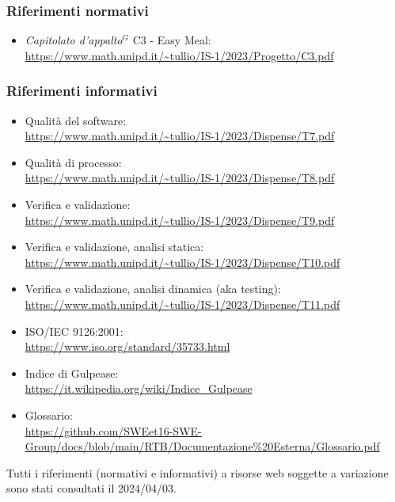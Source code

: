\subsubsection{Riferimenti normativi}
    \begin{itemize}
      \item \emph{Capitolato d’appalto}$^{G}$ C3 - Easy Meal: \\
        \url{https://www.math.unipd.it/~tullio/IS-1/2023/Progetto/C3.pdf}
    \end{itemize}
\subsubsection{Riferimenti informativi}
\begin{itemize}
    \item Qualità del software: \\
    \url{https://www.math.unipd.it/~tullio/IS-1/2023/Dispense/T7.pdf}
    \item Qualità di processo:\\
    \url{https://www.math.unipd.it/~tullio/IS-1/2023/Dispense/T8.pdf}
    \item Verifica e validazione: \\
    \url{https://www.math.unipd.it/~tullio/IS-1/2023/Dispense/T9.pdf}
    \item Verifica e validazione, analisi statica:\\
    \url{https://www.math.unipd.it/~tullio/IS-1/2023/Dispense/T10.pdf}
    \item Verifica e validazione, analisi dinamica (aka testing): \\
    \url{https://www.math.unipd.it/~tullio/IS-1/2023/Dispense/T11.pdf}
    \item ISO/IEC 9126:2001: \\
    \url{https://www.iso.org/standard/35733.html}
    \item Indice di Gulpease: \\
    \url{https://it.wikipedia.org/wiki/Indice_Gulpease}
    \item Glossario: \\
    \url{https://github.com/SWEet16-SWE-Group/docs/blob/main/RTB/Documentazione%20Esterna/Glossario.pdf}
\end{itemize}

Tutti i riferimenti (normativi e informativi) a risorse web soggette a variazione sono stati consultati il 2024/04/03.

